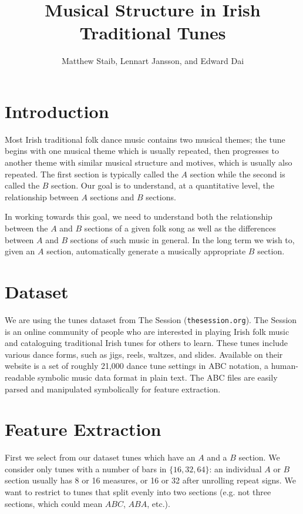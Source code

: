 \documentclass{article} %
\title{Musical Structure in Irish Traditional Tunes}
\author{Matthew Staib, Lennart Jansson, and Edward Dai}
\begin{document}
\maketitle

\section{Introduction}
Most Irish traditional folk dance music contains two musical themes; the tune
begins with one musical theme which is usually repeated, then progresses to
another theme with similar musical structure and motives, which is usually also
repeated. The first section is typically called the $A$ section while the second
is called the $B$ section. Our goal is to understand, at a quantitative level,
the relationship between $A$ sections and $B$ sections.

In working towards this goal, we need to understand both the relationship
between the $A$ and $B$ sections of a given folk song as well as the differences
between $A$ and $B$ sections of such music in general. In the long term we wish
to, given an $A$ section, automatically generate a musically appropriate $B$
section.

\section{Dataset}

We are using the tunes dataset from The Session (\texttt{thesession.org}). The
Session is an online community of people who are interested in playing Irish
folk music and cataloguing traditional Irish tunes for others to learn. These
tunes include various dance forms, such as jigs, reels, waltzes, and slides.
Available on their website is a set of roughly 21,000 dance tune settings
in ABC notation, a human-readable symbolic music data format in plain text. The
ABC files are easily parsed and manipulated symbolically for feature extraction.

\section{Feature Extraction}

First we select from our dataset tunes which have an $A$ and a $B$ section. We
consider only tunes with a number of bars in $\{16, 32, 64\}$: an individual $A$
or $B$ section usually has 8 or 16 measures, or 16 or 32 after unrolling repeat
signs. We want to restrict to tunes that split evenly into two sections (e.g.
not three sections, which could mean $ABC$, $ABA$, etc.).
\end{document}
